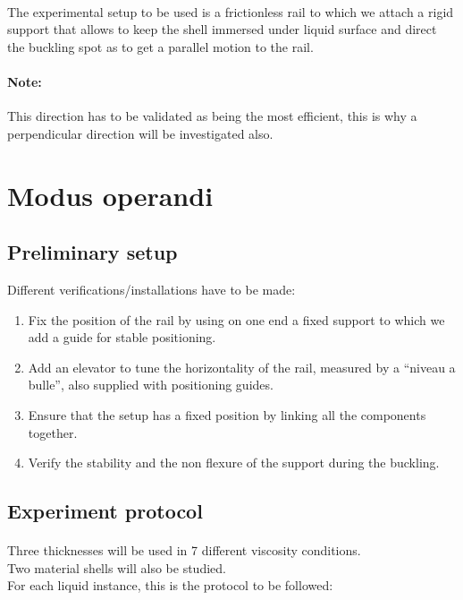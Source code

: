 \documentclass[a4paper,twoside,10pt]{report}
\begin{document}
\paragraph{}
The experimental setup to be used is a frictionless rail to which we attach a rigid support that allows to keep the shell immersed under liquid surface and direct the buckling spot as to get a parallel motion to the rail.
\paragraph{Note:}
This direction has to be validated as being the most efficient, this is why a perpendicular direction will be investigated also.

\newpage
\section{Modus operandi}
\subsection{Preliminary setup}
Different verifications/installations have to be made:

\begin{enumerate}
	\item Fix the position of the rail by using on one end a fixed support to which we add a guide for stable positioning.
	\item Add an elevator to tune the horizontality of the rail, measured by a ``niveau a bulle'', also supplied with positioning guides.
	\item Ensure that the setup has a fixed position by linking all the components together.
	\item Verify the stability and the non flexure of the support during the buckling.
\end{enumerate}
\newpage
\subsection{Experiment protocol}

\paragraph{}
Three thicknesses will be used in 7 different viscosity conditions.\\
Two material shells will also be studied.\\
For each liquid instance, this is the protocol to be followed:
\end{document}
